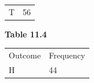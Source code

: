 {\begin{mdframed}[linewidth=4, leftmargin=40, rightmargin=40]
\begin{exercise}
\begin{enumerate}[noitemsep, label=\textbf{Step} \textbf{\arabic*}. ]
{{\begin{center}
\begin{tabular}[t]{|l|l|}
        T &
        56%
     \tabularnewline\cline{1-1}\cline{2-2}
    \end{tabular}
      \end{center}
    \begin{center}{\small\bfseries Table 11.4}\end{center}
          }{ %
        \begin{center}
      \label{m39373*id113415}
    \noindent
      \tablelasttail{}
      \begin{xtabular}[t]{|l|l|}\hline
        Outcome &
        Frequency%
     \tabularnewline{}
        H &
        44%
     \tabularnewline{}

\end{xtabular}
\end{center}}}
\end{enumerate}
\end{exercise}
\end{mdframed}}
